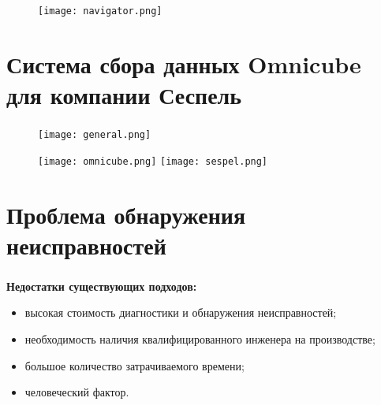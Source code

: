 \begin{frame}
\frametitle{\insertsection}

\begin{figure}
    \center
    \texttt{[image: navigator.png]}
\end{figure}
\end{frame}


\section{Система сбора данных Omnicube для компании Сеспель}

\begin{frame}
\frametitle{\insertsection}

\begin{figure}
    \center
    \texttt{[image: general.png]}
\end{figure}

\begin{figure}
    \center
    \texttt{[image: omnicube.png]}
    \hfill
    \texttt{[image: sespel.png]}
\end{figure}

\end{frame}


\section{Проблема обнаружения неисправностей}

\begin{frame}
\frametitle{\insertsection}

\textbf{Недостатки существующих подходов:}
\begin{itemize}
    \item высокая стоимость диагностики и обнаружения неисправностей;
    \item необходимость наличия квалифицированного инженера на производстве;
    \item большое количество затрачиваемого времени;
    \item человеческий фактор.
\end{itemize}

\end{frame}

